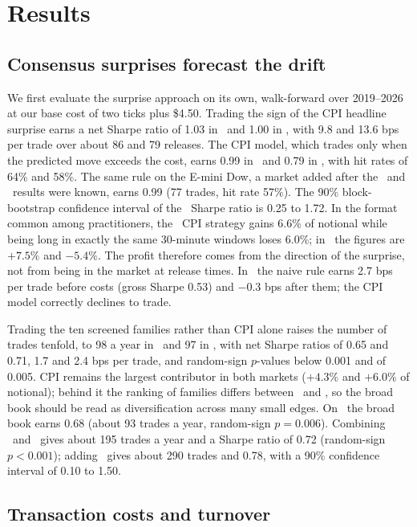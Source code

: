 \section{Results}\label{sec:results}

\subsection{Consensus surprises forecast the drift}

We first evaluate the surprise approach on its own, walk-forward over 2019--2026 at our base cost
of two ticks plus \$4.50. Trading the sign of the CPI headline surprise earns a net Sharpe ratio
of 1.03 in \ES\ and 1.00 in \NQ, with 9.8 and 13.6 bps per trade over about 86 and 79 releases. The
CPI model, which trades only when the predicted move exceeds the cost, earns 0.99 in \ES\ and 0.79
in \NQ, with hit rates of 64\% and 58\%. The same rule on the E-mini Dow, a market added after the
\ES\ and \NQ\ results were known, earns 0.99 (77 trades, hit rate 57\%). The 90\% block-bootstrap confidence interval of the \ES\
Sharpe ratio is 0.25 to 1.72. In the format common among practitioners, the \ES\ CPI strategy gains
6.6\% of notional while being long in exactly the same 30-minute windows loses 6.0\%; in \NQ\ the
figures are $+7.5\%$ and $-5.4\%$. The profit therefore comes from the direction of the surprise,
not from being in the market at release times. In \ZN\ the naive rule earns 2.7 bps per trade
before costs (gross Sharpe 0.53) and $-0.3$ bps after them; the CPI model correctly declines to
trade.

Trading the ten screened families rather than CPI alone raises the number of trades tenfold, to 98
a year in \ES\ and 97 in \NQ, with net Sharpe ratios of 0.65 and 0.71, 1.7 and 2.4 bps per trade, and
random-sign $p$-values below 0.001 and of 0.005. CPI remains the largest contributor in both markets
($+4.3\%$ and $+6.0\%$ of notional); behind it the ranking of families differs between \ES\ and \NQ,
so the broad book should be read as diversification across many small edges. On \YM\ the broad book
earns 0.68 (about 93 trades a year, random-sign $p=0.006$). Combining \ES\ and \NQ\ gives about 195
trades a year and a Sharpe ratio of 0.72 (random-sign $p<0.001$); adding \YM\ gives about 290 trades
and 0.78, with a 90\% confidence interval of 0.10 to 1.50.

\subsection{Transaction costs and turnover}

